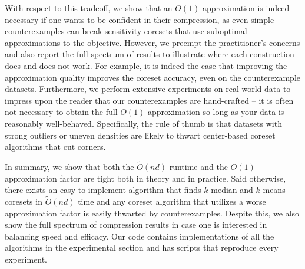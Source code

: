 With respect to this tradeoff, we show that an $O(1)$ approximation is indeed necessary if one wants to be confident in their compression, as even simple
counterexamples can break sensitivity coresets that use suboptimal approximations to the objective. However, we preempt the practitioner's concerns and also report
the full spectrum of results to illustrate where each construction does and does not work. For example, it is indeed the case that improving the approximation
quality improves the coreset accuracy, even on the counterexample datasets. Furthermore, we perform extensive experiments on real-world data to impress upon the
reader that our counterexamples are hand-crafted -- it is often not necessary to obtain the full $O(1)$ approximation so long as your data is reasonably
well-behaved. Specifically, the rule of thumb is that datasets with strong outliers or uneven densities are likely to thwart center-based coreset
algorithms that cut corners.

In summary, we show that both the $\tilde{O}(nd)$ runtime and the $O(1)$ approximation factor are tight both in theory and in practice.
Said otherwise, there exists an easy-to-implement algorithm that finds $k$-median and $k$-means coresets in $\tilde{O}(nd)$ time and any coreset
algorithm that utilizes a worse approximation factor is easily thwarted by counterexamples. Despite this, we also show the full spectrum of compression results
in case one is interested in balancing speed and efficacy. Our code contains implementations of all the algorithms in the experimental section and has scripts
that reproduce every experiment.

